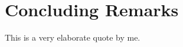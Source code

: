 %
%
% 
% 

\chapter{Concluding Remarks}

\label{chap:Conclusion}

\begin{displayquote}
  This is a very elaborate quote by me.
\end{displayquote}

